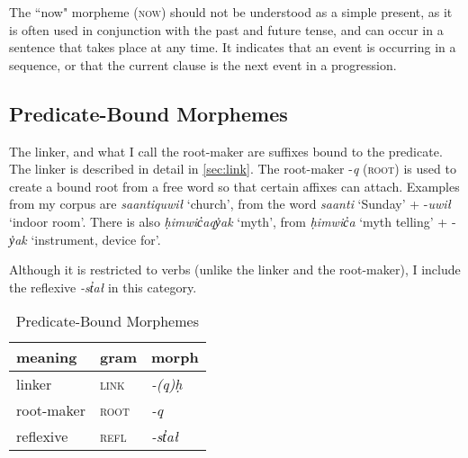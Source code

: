 \addtocounter{footnote}{-1}
\addtocounter{footnote}{1}

The ``now" morpheme (\textsc{now}) should not be understood as a simple present, as it is often used in conjunction with the past and future tense, and can occur in a sentence that takes place at any time. It indicates that an event is occurring in a sequence, or that the current clause is the next event in a progression.

\subsection{Predicate-Bound Morphemes}

The linker, and what I call the root-maker are suffixes bound to the predicate. The linker is described in detail in \cref{sec:link}. The root-maker -\textit{q} (\textsc{root}) is used to create a bound root from a free word so that certain affixes can attach. Examples from my corpus are \textit{saantiquwił} `church', from the word \textit{saanti} `Sunday' + -\textit{uwił} `indoor room'. There is also \textit{ḥimwic̓aqy̓ak} `myth', from \textit{ḥimwic̓a} `myth telling' + -\textit{y̓ak} `instrument, device for'.

Although it is restricted to verbs (unlike the linker and the root-maker), I include the reflexive \textit{-st̓ał} in this category.

\begin{table}[ht]
\centering
\caption{Predicate-Bound Morphemes}
\label{table:predicate}
\begin{tabular}{lll}
meaning                         & gram              & morph                       \\ \hline
\multicolumn{1}{|l|}{linker}    & \multicolumn{1}{l|}{\textsc{link}} & \multicolumn{1}{l|}{\textit{-(q)ḥ}} \\ \hline
\multicolumn{1}{|l|}{root-maker}    & \multicolumn{1}{l|}{\textsc{root}} & \multicolumn{1}{l|}{\textit{-q}} \\ \hline
\multicolumn{1}{|l|}{reflexive} & \multicolumn{1}{l|}{\textsc{refl}} & \multicolumn{1}{l|}{\textit{-st̓ał}} \\ \hline
\end{tabular}
\end{table}

